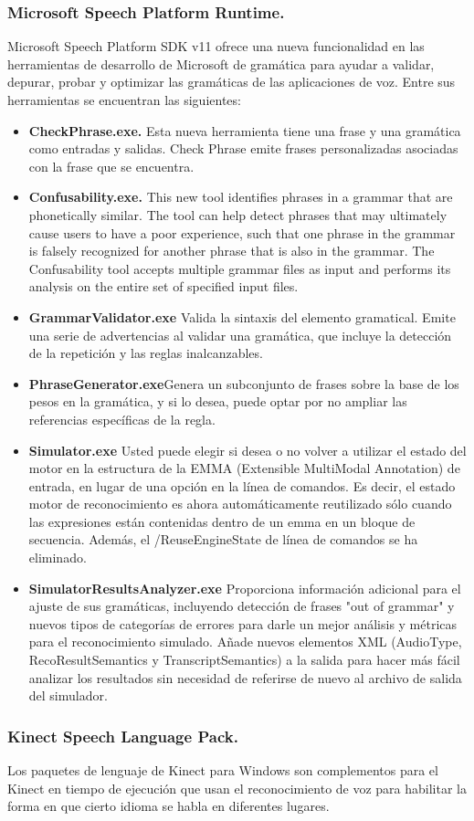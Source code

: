 \documentclass[11pt,a4paper]{article}
\begin{document}
\subsubsection{Microsoft Speech Platform Runtime.}
Microsoft Speech Platform SDK v11 ofrece una nueva funcionalidad en las herramientas de desarrollo de Microsoft de gramática para ayudar a validar, depurar, probar y optimizar las gramáticas de las aplicaciones de voz. Entre sus herramientas se encuentran las siguientes:
\begin{itemize}
\item \textbf{CheckPhrase.exe.} Esta nueva herramienta tiene una frase y una gramática como entradas y salidas. Check Phrase emite frases personalizadas asociadas con la frase que se encuentra.
\item \textbf{Confusability.exe.} This new tool identifies phrases in a grammar that are phonetically similar. The tool can help detect phrases that may ultimately cause users to have a poor experience, such that one phrase in the grammar is falsely recognized for another phrase that is also in the grammar. The Confusability tool accepts multiple grammar files as input and performs its analysis on the entire set of specified input files.
\item \textbf{GrammarValidator.exe} Valida la sintaxis del elemento gramatical. Emite una serie de advertencias al validar una gramática, que incluye la detección de la repetición y las reglas inalcanzables.
\item \textbf{PhraseGenerator.exe}Genera un subconjunto de frases sobre la base de los pesos en la gramática, y si lo desea, puede optar por no ampliar las referencias específicas de la regla.
\item \textbf{Simulator.exe} Usted puede elegir si desea o no volver a utilizar el estado del motor en la estructura de la EMMA (Extensible MultiModal Annotation) de entrada, en lugar de una opción en la línea de comandos. Es decir, el estado motor de reconocimiento es ahora automáticamente reutilizado sólo cuando las expresiones están contenidas dentro de un emma en un bloque de secuencia. Además, el /ReuseEngineState de línea de comandos se ha eliminado.
\item \textbf{SimulatorResultsAnalyzer.exe} Proporciona información adicional para el ajuste de sus gramáticas, incluyendo detección de frases "out of grammar" y nuevos tipos de categorías de errores para darle un mejor análisis y métricas para el reconocimiento simulado. Añade nuevos elementos XML (AudioType, RecoResultSemantics y TranscriptSemantics) a la salida para hacer más fácil analizar los resultados sin necesidad de referirse de nuevo al archivo de salida del simulador.
\end{itemize} 

\subsubsection{Kinect Speech Language Pack.}
Los paquetes de lenguaje de Kinect para Windows son complementos para el Kinect en tiempo de ejecución que usan el reconocimiento de voz para habilitar la forma en que cierto idioma se habla en diferentes lugares.
\end{document}
